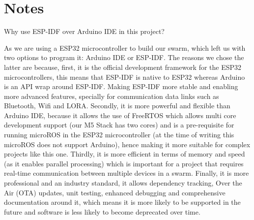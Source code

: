 \documentclass{report}
\begin{document}
\section{Notes}
Why use ESP-IDF over Arduino IDE in this project? \cite{esp-boards_esp-idf_nodate}\cite{expressif_freertos_nodate}

As we are using a ESP32 microcontroller to build our swarm, which left us with two options to program it: Arduino IDE or ESP-IDF. The reasons we chose the latter are because, first, it is the official development framework for the ESP32 microcontrollers, this means that ESP-IDF is native to ESP32 whereas Arduino is an API wrap around ESP-IDF. Making ESP-IDF more stable and enabling more advanced features, specially for communication data links such as Bluetooth, Wifi and LORA. Secondly, it is more powerful and flexible than Arduino IDE, because it allows the use of FreeRTOS which allows multi core development support (our M5 Stack has two cores) and is a pre-requisite for running microROS in the ESP32 microcontroller (at the time of writing this microROS does not support Arduino), hence making it more suitable for complex projects like this one. Thirdly, it is more efficient in terms of memory and speed (as it enables parallel processing) which is important for a project that requires real-time communication between multiple devices in a swarm. Finally, it is more professional and an industry standard, it allows dependency tracking, Over the Air (OTA) updates, unit testing, enhanced debugging and comprehensive documentation around it, which means it is more likely to be supported in the future and software is less likely to become deprecated over time.


\newpage
\printbibliography
\end{document}
